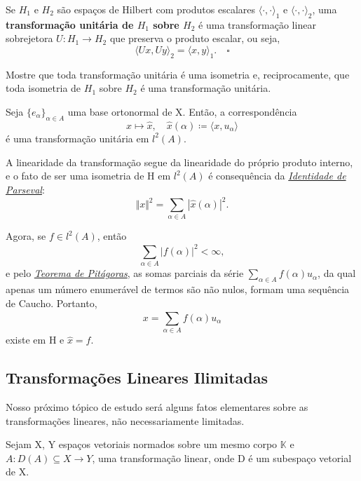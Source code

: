 \documentclass[../functional_analysis.tex]{subfiles}
\begin{document}
\begin{def*}
	Se \(H_1\) e \(H_2\) são espaços de Hilbert com produtos escalares \(\langle \cdot , \cdot  \rangle_1\) e \(\langle \cdot , \cdot  \rangle_2\), uma \textbf{transformação unitária de \(H_1\) sobre \(H_2\)} é uma transformação linear sobrejetora \(U:H_1\rightarrow H_2\) que preserva o produto escalar, ou seja,
	\[
		\langle Ux, Uy \rangle_2 = \langle x, y \rangle_1. \quad \square
	\]
\end{def*}
\begin{exr}
	Mostre que toda transformação unitária é uma isometria e, reciprocamente, que toda isometria de \(H_1\) sobre \(H_2\) é uma transformação unitária.
\end{exr}
\begin{prop*}
	Seja \(\{e_{\alpha }\}_{\alpha \in A}\) uma base ortonormal de X. Então, a correspondência
	\[
		x\mapsto \hat{x},\quad \hat{x}(\alpha )\coloneqq \langle x, u_{\alpha } \rangle
	\]
	é uma transformação unitária em \(l^{2}(A).\)
\end{prop*}
\begin{proof*}
	A linearidade da transformação segue da linearidade do próprio produto interno, e o fato de ser uma isometria de H em \(l^{2}(A)\) é consequência da \hyperlink{parseval_identity}{\textit{Identidade de Parseval}}:
	\[
		\Vert x \Vert^{2} = \sum\limits_{\alpha \in A}^{}| \hat{x}(\alpha ) |^{2}.
	\]

	Agora, se \(f\in l^{2}(A)\), então
	\[
		\sum\limits_{\alpha \in A}^{} | f(\alpha ) |^{2}<\infty,
	\]
	e pelo \hyperlink{pythagorean_theorem}{\textit{Teorema de Pitágoras}}, as somas parciais da série \(\sum\limits_{\alpha \in A}^{}f(\alpha )u_{\alpha }\), da qual apenas um número enumerável de termos são não nulos, formam uma sequência de Caucho. Portanto,
	\[
		x = \sum\limits_{\alpha \in A}^{}f(\alpha )u_{\alpha }
	\]
	existe em H e \(\hat{x}=f.\) \qedsymbol
\end{proof*}
\subsection{Transformações Lineares Ilimitadas}

Nosso próximo tópico de estudo será alguns fatos elementares sobre as transformações lineares, não necessariamente limitadas.

Sejam X, Y espaços vetoriais normados sobre um mesmo corpo \(\mathbb{K}\) e \(A:D(A)\subseteq X\rightarrow Y\), uma transformação linear, onde D é um subespaço vetorial de X.
\end{document}
